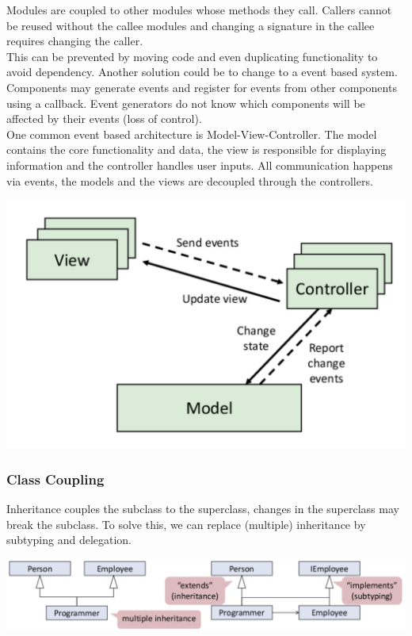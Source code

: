 Modules are coupled to other modules whose methods they call. Callers cannot be reused without the callee modules and changing a signature in the callee requires changing the caller. \\

This can be prevented by moving code and even duplicating functionality to avoid dependency. Another solution could be to change to a event based system. Components may generate events and register for events from other components using a callback. Event generators do not know which components will be affected by their events (loss of control). \\

One common event based architecture is Model-View-Controller. The model contains the core functionality and data, the view is responsible for displaying information and the controller handles user inputs. All communication happens via events, the models and the views are decoupled through the controllers.
\begin{center}
	\includegraphics[width=0.7\columnwidth]{assets/mvc}
\end{center}

\subsubsection{Class Coupling}

Inheritance couples the subclass to the superclass, changes in the superclass may break the subclass. To solve this, we can replace (multiple) inheritance by subtyping and delegation.
\begin{center}
	\includegraphics[width=\columnwidth]{assets/inheritance}
\end{center}

